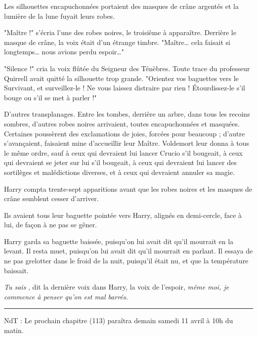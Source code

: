 Les silhouettes encapuchonnées portaient des masques de crâne argentés et la lumière de la lune fuyait leurs robes.

"Maître !" s'écria l'une des robes noires, le troisième à apparaître. Derrière le masque de crâne, la voix était d'un étrange timbre. "Maître… cela faisait si longtemps… nous avions perdu espoir…"

"Silence !" cria la voix flûtée du Seigneur des Ténèbres. Toute trace du professeur Quirrell avait quitté la silhouette trop grande. "Orientez vos baguettes vers le Survivant, et surveillez-le ! Ne vous laissez distraire par rien ! Étourdissez-le s'il bouge ou s'il se met à parler !"

D'autres transplanages. Entre les tombes, derrière un arbre, dans tous les recoins sombres, d'autres robes noires arrivaient, toutes encapuchonnées et masquées. Certaines poussèrent des exclamations de joies, forcées pour beaucoup ; d'autre s'avançaient, faisaient mine d'accueillir leur Maître. Voldemort leur donna à tous le même ordre, sauf à ceux qui devraient lui lancer Crucio s'il bougeait, à ceux qui devraient se jeter sur lui s'il bougeait, à ceux qui devraient lui lancer des sortilèges et malédictions diverses, et à ceux qui devraient annuler sa magie.

Harry compta trente-sept apparitions avant que les robes noires et les masques de crâne semblent cesser d'arriver.

Ils avaient tous leur baguette pointée vers Harry, alignés en demi-cercle, face à lui, de façon à ne pas se gêner.

Harry garda sa baguette baissée, puisqu'on lui avait dit qu'il mourrait en la levant. Il resta muet, puisqu'on lui avait dit qu'il mourrait en parlant. Il essaya de ne pas grelotter dans le froid de la nuit, puisqu'il était nu, et que la température baissait.

\emph{Tu sais} , dit la dernière voix dans Harry, la voix de l'espoir, \emph{même moi, je commence à penser qu'on est mal barrés.} 
\par\noindent\rule{\textwidth}{0.4pt}
NdT : Le prochain chapitre (113) paraîtra demain samedi 11 avril à 10h du matin.

